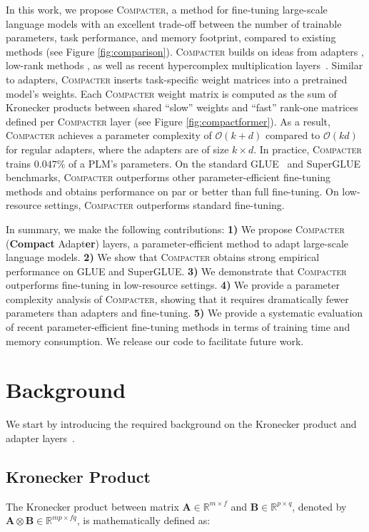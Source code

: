 In this work, we propose \textsc{Compacter}, a method for fine-tuning large-scale language models with an excellent trade-off between the number of trainable parameters, task performance, and memory footprint, compared to existing methods (see Figure \ref{fig:comparison}). \textsc{Compacter} builds on ideas from adapters \citep{houlsby2019parameter}, low-rank methods \citep{li2018measuring}, as well as recent hypercomplex multiplication layers~\citep{zhang2021beyond}. Similar to adapters, \textsc{Compacter} inserts task-specific weight matrices into a pretrained model's weights. Each \textsc{Compacter} weight matrix is computed as the sum of Kronecker products between shared ``slow'' weights and ``fast'' rank-one matrices defined per \textsc{Compacter} layer (see Figure \ref{fig:compactformer}). As a result, \textsc{Compacter} achieves a parameter complexity of $\mathcal{O}(k+d)$ compared to $\mathcal{O}(kd)$ for regular adapters, where the adapters are of size $k\!{\times}\! d$. In practice, \textsc{Compacter} trains $0.047\%$ of a PLM's parameters. On the standard GLUE~\citep{wang2018glue} and SuperGLUE~\citep{wang2019superglue} benchmarks, \textsc{Compacter} outperforms other parameter-efficient fine-tuning methods and obtains performance on par or better than full fine-tuning. On low-resource settings, \textsc{Compacter} outperforms standard fine-tuning. 

In summary, we make the following contributions:
\textbf{1)} We propose \textsc{Compacter} (\textbf{Compact} Adapt\textbf{er}) layers, a parameter-efficient method to adapt large-scale language models. 
\textbf{2)} We show that \textsc{Compacter} obtains strong empirical performance on GLUE and SuperGLUE. 
\textbf{3)} We demonstrate that \textsc{Compacter} outperforms fine-tuning in low-resource settings.
\textbf{4)} We provide a parameter complexity analysis of \textsc{Compacter}, showing that it requires dramatically fewer parameters than adapters and fine-tuning.
\textbf{5)} We provide a systematic evaluation of recent parameter-efficient fine-tuning methods in terms of training time and memory consumption. We release our code to facilitate future work.

\section{Background}
We start by introducing the required background on the Kronecker product and adapter layers~\citep{houlsby2019parameter, rebuffi2018efficient}. 
\subsection{Kronecker Product} The Kronecker product between matrix $\bm{A}\in \mathbb{R}^{m\times f}$ and $\bm{B} \in \mathbb{R}^{p\times q}$, denoted by $\bm{A}\otimes \bm{B} \in \mathbb{R}^{mp\times fq}$, is mathematically defined as:

